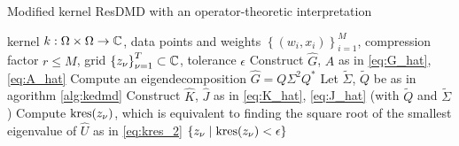 \begin{algorithm}
    \caption{Modified kernel ResDMD with an operator-theoretic interpretation}
    \label{alg:kresdmd_correct}
    \begin{algorithmic}[1]
        \Require kernel $k : \Omega \times \Omega \to \mathbb{C}$, data points and weights 
            $\left\{ (w_i, x_i) \right\}_{i=1}^M$, compression factor $r \leq M$,
            grid $\left\{ z_\nu \right\}_{\nu=1}^T \subset \mathbb{C}$,
            tolerance $\epsilon$
        \State Construct $\widehat{G}$, $\widehat{A}$ as in \ref{eq:G_hat}, \ref{eq:A_hat}
        \State Compute an eigendecomposition $\widehat{G} = Q \Sigma^2 Q^*$
        \State Let $\widetilde{\Sigma}$, $\widetilde{Q}$ be as in agorithm \ref{alg:kedmd}
        \State Construct $\widehat{ K }$, $\widehat{ J }$ as in \ref{eq:K_hat}, 
            \ref{eq:J_hat} (with $\widetilde{ Q }$ and $\widetilde{ \Sigma }$)
        \State Compute $\text{kres} (z_\nu)$, which is equivalent 
            to finding the square root of the smallest 
            eigenvalue of $\widehat{ U }$ as in \ref{eq:kres_2}
        \EndFor
        \State \Return $\left\{ z_\nu \mid \text{kres} (z_\nu) < \epsilon \right\}$
    \end{algorithmic}
\end{algorithm}


